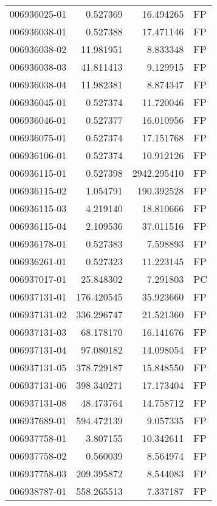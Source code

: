 \begin{tabular}{lrrl}
006936025-01 &    0.527369 &      16.494265 &   FP \\
006936038-01 &    0.527388 &      17.471146 &   FP \\
006936038-02 &   11.981951 &       8.833348 &   FP \\
006936038-03 &   41.811413 &       9.129915 &   FP \\
006936038-04 &   11.982381 &       8.874347 &   FP \\
006936045-01 &    0.527374 &      11.720046 &   FP \\
006936046-01 &    0.527377 &      16.010956 &   FP \\
006936075-01 &    0.527374 &      17.151768 &   FP \\
006936106-01 &    0.527374 &      10.912126 &   FP \\
006936115-01 &    0.527398 &    2942.295410 &   FP \\
006936115-02 &    1.054791 &     190.392528 &   FP \\
006936115-03 &    4.219140 &      18.810666 &   FP \\
006936115-04 &    2.109536 &      37.011516 &   FP \\
006936178-01 &    0.527383 &       7.598893 &   FP \\
006936261-01 &    0.527323 &      11.223145 &   FP \\
006937017-01 &   25.848302 &       7.291803 &   PC \\
006937131-01 &  176.420545 &      35.923660 &   FP \\
006937131-02 &  336.296747 &      21.521360 &   FP \\
006937131-03 &   68.178170 &      16.141676 &   FP \\
006937131-04 &   97.080182 &      14.098054 &   FP \\
006937131-05 &  378.729187 &      15.848550 &   FP \\
006937131-06 &  398.340271 &      17.173404 &   FP \\
006937131-08 &   48.473764 &      14.758712 &   FP \\
006937689-01 &  594.472139 &       9.057335 &   FP \\
006937758-01 &    3.807155 &      10.342611 &   FP \\
006937758-02 &    0.560039 &       8.564974 &   FP \\
006937758-03 &  209.395872 &       8.544083 &   FP \\
006938787-01 &  558.265513 &       7.337187 &   FP \\

\end{tabular}
